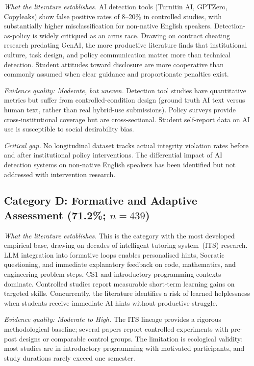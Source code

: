 \documentclass[conference]{IEEEtran}
\begin{document}
\textit{What the literature establishes.}
AI detection tools (Turnitin AI, GPTZero, Copyleaks) show false positive rates of 8--20\% in
controlled studies, with substantially higher misclassification for non-native English speakers.
Detection-as-policy is widely critiqued as an arms race. Drawing on contract cheating research
predating GenAI, the more productive literature finds that institutional culture, task design, and
policy communication matter more than technical detection. Student attitudes toward disclosure are
more cooperative than commonly assumed when clear guidance and proportionate penalties exist.

\textit{Evidence quality: Moderate, but uneven.}
Detection tool studies have quantitative metrics but suffer from controlled-condition design (ground
truth AI text versus human text, rather than real hybrid-use submissions). Policy surveys provide
cross-institutional coverage but are cross-sectional. Student self-report data on AI use is susceptible
to social desirability bias.

\textit{Critical gap.}
No longitudinal dataset tracks actual integrity violation rates before and after institutional policy
interventions. The differential impact of AI detection systems on non-native English speakers has
been identified but not addressed with intervention research.

\subsection{Category D: Formative and Adaptive Assessment (71.2\%; $n = 439$)}

\textit{What the literature establishes.}
This is the category with the most developed empirical base, drawing on decades of intelligent
tutoring system~(ITS) research. LLM integration into formative loops enables personalised hints,
Socratic questioning, and immediate explanatory feedback on code, mathematics, and engineering
problem steps. CS1 and introductory programming contexts dominate. Controlled studies report
measurable short-term learning gains on targeted skills. Concurrently, the literature identifies a
risk of learned helplessness when students receive immediate AI hints without productive struggle.

\textit{Evidence quality: Moderate to High.}
The ITS lineage provides a rigorous methodological baseline; several papers report controlled
experiments with pre-post designs or comparable control groups. The limitation is ecological validity:
most studies are in introductory programming with motivated participants, and study durations rarely
exceed one semester.
\end{document}
